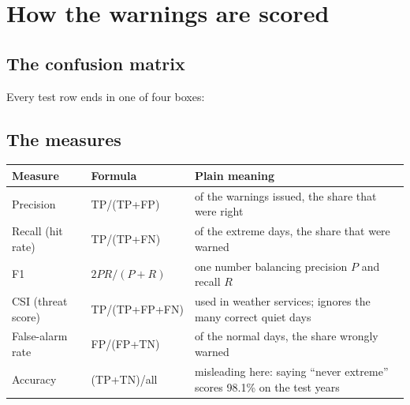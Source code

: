 \chapter{How the warnings are scored}
\label{ch:metrics}

\section{The confusion matrix}
Every test row ends in one of four boxes:
\begin{center}
\end{center}

\section{The measures}
\begin{center}
\footnotesize
\begin{tabular}{p{3.0cm}p{3.6cm}p{7.2cm}}
\toprule
\textbf{Measure} & \textbf{Formula} & \textbf{Plain meaning}\\
\midrule
Precision & TP/(TP+FP) & of the warnings issued, the share that were right\\
Recall (hit rate) & TP/(TP+FN) & of the extreme days, the share that were warned\\
F1 & $2PR/(P+R)$ & one number balancing precision $P$ and recall $R$\\
CSI (threat score) & TP/(TP+FP+FN) & used in weather services; ignores the many correct quiet days\\
False-alarm rate & FP/(FP+TN) & of the normal days, the share wrongly warned\\
Accuracy & (TP+TN)/all & misleading here: saying ``never extreme'' scores 98.1\% on the test years\\
\bottomrule
\end{tabular}
\end{center}

